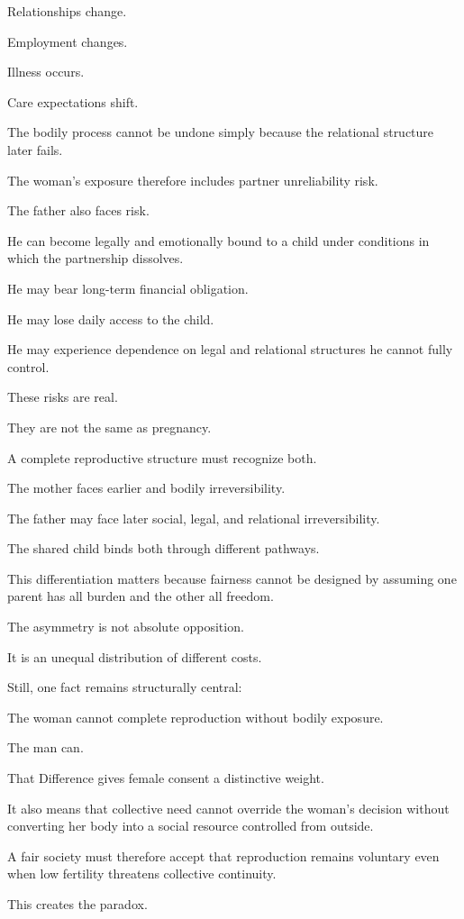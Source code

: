 Relationships change.

Employment changes.

Illness occurs.

Care expectations shift.

The bodily process cannot be undone simply because the relational structure later fails.

The woman’s exposure therefore includes partner unreliability risk.

The father also faces risk.

He can become legally and emotionally bound to a child under conditions in which the partnership dissolves.

He may bear long-term financial obligation.

He may lose daily access to the child.

He may experience dependence on legal and relational structures he cannot fully control.

These risks are real.

They are not the same as pregnancy.

A complete reproductive structure must recognize both.

The mother faces earlier and bodily irreversibility.

The father may face later social, legal, and relational irreversibility.

The shared child binds both through different pathways.

This differentiation matters because fairness cannot be designed by assuming one parent has all burden and the other all freedom.

The asymmetry is not absolute opposition.

It is an unequal distribution of different costs.

Still, one fact remains structurally central:

The woman cannot complete reproduction without bodily exposure.

The man can.

That Difference gives female consent a distinctive weight.

It also means that collective need cannot override the woman’s decision without converting her body into a social resource controlled from outside.

A fair society must therefore accept that reproduction remains voluntary even when low fertility threatens collective continuity.

This creates the paradox.

